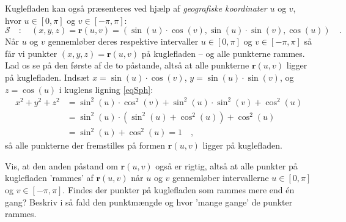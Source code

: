 Kuglefladen kan også præsenteres ved hjælp af {\emph{geografiske koordinater}} $u$ og $v$, hvor $u \in [0, \pi]$ og $v\in [-\pi, \pi]$:
\begin{equation}
\mathcal{S} \quad : \quad (x,y,z) = \mathbf{r}(u,v) = (\sin(u)\cdot \cos(v), \sin(u)\cdot \sin(v), \cos(u) ) \quad.
\end{equation}
Når $u$ og $v$ gennemløber deres respektive intervaller $u \in [0, \pi]$ og $v\in [-\pi, \pi]$ så får vi punkter $(x,y,z) = \mathbf{r}(u,v)$ på kuglefladen -- og alle punkterne rammes.
Lad os se på den første af de to påstande, altså at alle punkterne $\mathbf{r}(u,v)$ ligger på kuglefladen. Indsæt $x=\sin(u)\cdot \cos(v)$, $y= \sin(u)\cdot \sin(v)$, og $z= \cos(u)$ i kuglens ligning \ref{eqSph}:
\begin{equation}
\begin{aligned}
x^{2} + y^{2} + z^{2} &= \sin^{2}(u)\cdot \cos^{2}(v) + \sin^{2}(u)\cdot \sin^{2}(v) + \cos^{2}(u) \\
&= \sin^{2}(u)\cdot \left(\sin^{2}(u) +  \cos^{2}(u)\right) + \cos^{2}(u) \\
&= \sin^{2}(u) + \cos^{2}(u) = 1 \quad,
\end{aligned}
\end{equation}
så alle punkterne der fremstilles på formen $\mathbf{r}(u,v)$ ligger på kuglefladen.

\begin{exercise} \label{exercSphCheck}
Vis, at den anden påstand om $\mathbf{r}(u,v)$ også er rigtig, altså at alle punkter på kuglefladen 'rammes' af $\mathbf{r}(u,v)$ når $u$ og $v$ gennemløber intervallerne $u \in [0, \pi]$ og $v \in [-\pi, \pi]$. Findes der punkter på kuglefladen som rammes mere end \'{e}n gang? Beskriv i så fald den punktmængde og hvor 'mange gange' de punkter rammes.
\end{exercise}

